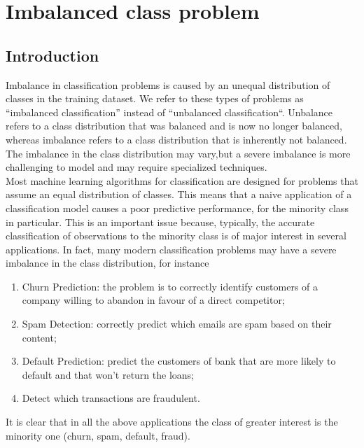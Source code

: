 \chapter{Imbalanced class problem}


\section{Introduction}
Imbalance in  classification problems is caused by an unequal distribution of classes in the training dataset. We refer to these types of problems as “imbalanced classification” instead of “unbalanced classification“. Unbalance refers to a class distribution that was balanced and is now no longer balanced, whereas imbalance refers to a class distribution that is inherently not balanced. The imbalance in the class distribution may vary,but a severe imbalance is more challenging to model and may require specialized techniques.  \\
\noindent
Most machine learning algorithms for classification  are designed for problems that assume an equal distribution of classes. 
This means that a naive application of a classification model causes a poor predictive performance, for the minority class in particular. This is an important issue because, typically, the accurate classification of observations to the minority class is of major interest in several applications. In fact, many modern classification problems may have a severe imbalance in the class distribution, for instance
\begin{enumerate}
    \item {Churn Prediction: the problem is to correctly identify customers of a company willing to abandon in favour of  a direct competitor;}
    \item {Spam Detection: correctly predict which emails are  spam  based on their content;}
    \item {Default Prediction: predict the customers of bank that are more likely to default and that won't return the loans;}
    \item{Detect which transactions are fraudulent.} 
\end{enumerate}
\noindent
It is clear that in all the above applications the class of greater interest is the minority one (churn, spam, default, fraud).



